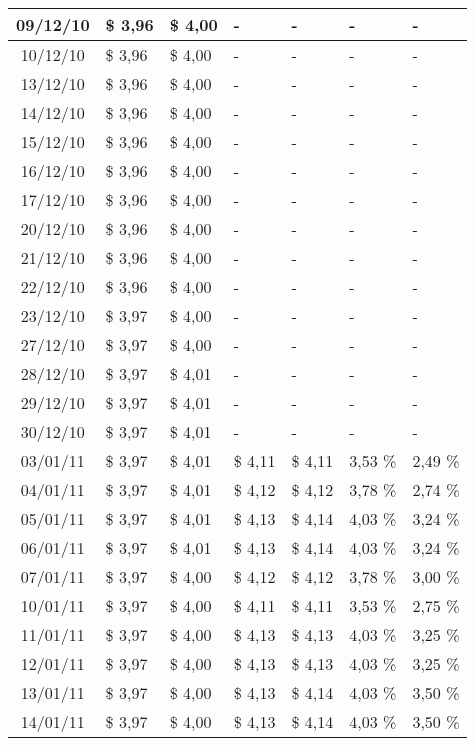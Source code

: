 \begin{center}
\begin{longtable}{|c|p{1.5cm}|p{1.5cm}|p{1.5cm}|p{1.5cm}|p{1.5cm}|p{1.5cm}|}
09/12/10 & \$ 3,96 & \$ 4,00 & - & - & - & - \\ \hline
10/12/10 & \$ 3,96 & \$ 4,00 & - & - & - & - \\ \hline
13/12/10 & \$ 3,96 & \$ 4,00 & - & - & - & - \\ \hline
14/12/10 & \$ 3,96 & \$ 4,00 & - & - & - & - \\ \hline
15/12/10 & \$ 3,96 & \$ 4,00 & - & - & - & - \\ \hline
16/12/10 & \$ 3,96 & \$ 4,00 & - & - & - & - \\ \hline
17/12/10 & \$ 3,96 & \$ 4,00 & - & - & - & - \\ \hline
20/12/10 & \$ 3,96 & \$ 4,00 & - & - & - & - \\ \hline
21/12/10 & \$ 3,96 & \$ 4,00 & - & - & - & - \\ \hline
22/12/10 & \$ 3,96 & \$ 4,00 & - & - & - & - \\ \hline
23/12/10 & \$ 3,97 & \$ 4,00 & - & - & - & - \\ \hline
27/12/10 & \$ 3,97 & \$ 4,00 & - & - & - & - \\ \hline
28/12/10 & \$ 3,97 & \$ 4,01 & - & - & - & - \\ \hline
29/12/10 & \$ 3,97 & \$ 4,01 & - & - & - & - \\ \hline
30/12/10 & \$ 3,97 & \$ 4,01 & - & - & - & - \\ \hline
03/01/11 & \$ 3,97 & \$ 4,01 & \$ 4,11 & \$ 4,11 & 3,53 \% & 2,49 \% \\ \hline
04/01/11 & \$ 3,97 & \$ 4,01 & \$ 4,12 & \$ 4,12 & 3,78 \% & 2,74 \% \\ \hline
05/01/11 & \$ 3,97 & \$ 4,01 & \$ 4,13 & \$ 4,14 & 4,03 \% & 3,24 \% \\ \hline
06/01/11 & \$ 3,97 & \$ 4,01 & \$ 4,13 & \$ 4,14 & 4,03 \% & 3,24 \% \\ \hline
07/01/11 & \$ 3,97 & \$ 4,00 & \$ 4,12 & \$ 4,12 & 3,78 \% & 3,00 \% \\ \hline
10/01/11 & \$ 3,97 & \$ 4,00 & \$ 4,11 & \$ 4,11 & 3,53 \% & 2,75 \% \\ \hline
11/01/11 & \$ 3,97 & \$ 4,00 & \$ 4,13 & \$ 4,13 & 4,03 \% & 3,25 \% \\ \hline
12/01/11 & \$ 3,97 & \$ 4,00 & \$ 4,13 & \$ 4,13 & 4,03 \% & 3,25 \% \\ \hline
13/01/11 & \$ 3,97 & \$ 4,00 & \$ 4,13 & \$ 4,14 & 4,03 \% & 3,50 \% \\ \hline
14/01/11 & \$ 3,97 & \$ 4,00 & \$ 4,13 & \$ 4,14 & 4,03 \% & 3,50 \% \\ \hline

\end{longtable}
\end{center}
